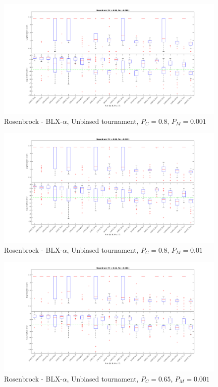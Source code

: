 \documentclass[12pt, letterpaper]{article}
\begin{document}
\begin{figure}
  \includegraphics[width=\linewidth]{img/r_blx_ut_08_001.png}
  \centering
  \captionsetup{justification=centering}
  \caption{Rosenbrock - BLX-$\alpha$, Unbiased tournament, $P_C = 0.8$, $P_M = 0.001$}
  \label{fig:r_blx_ut_08_001}
\end{figure}

\begin{figure}
  \includegraphics[width=\linewidth]{img/r_blx_ut_08_010.png}
  \centering
  \captionsetup{justification=centering}
  \caption{Rosenbrock - BLX-$\alpha$, Unbiased tournament, $P_C = 0.8$, $P_M = 0.01$}
  \label{fig:r_blx_ut_08_010}
\end{figure}

\begin{figure}
  \includegraphics[width=\linewidth]{img/r_blx_ut_065_001.png}
  \centering
  \captionsetup{justification=centering}
  \caption{Rosenbrock - BLX-$\alpha$, Unbiased tournament, $P_C = 0.65$, $P_M = 0.001$}
  \label{fig:r_blx_ut_065_001}
\end{figure}
\end{document}

